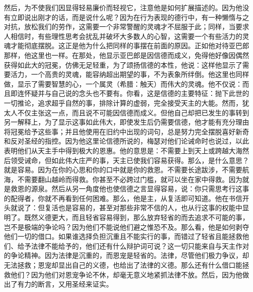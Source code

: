 然后，为不使我们因显得轻易廉价而轻视它，注意他是如何扩展描述的。因为他没有立即说出刚才的话，而是说什么呢？因为在行为表现的德行中，有一种懒惰与之对抗，放松我们的劳作，这需要一个非常警醒的灵魂才不屈服于此；同样，当要求人相信时，有些理性思考会扰乱并破坏大多数人的心智，这需要一个有些活力的灵魂才能彻底摆脱。这正是他为什么把同样的事摆在前面的原因。正如他对待亚巴郎那样，他这里也一样。在那处，他显示亚巴郎是因信德而成义，免得他好像因偶然获得如此大的冠冕，仿佛无足轻重，为了颂扬信德的本性，他说：这样他显示了需要活力，一个高贵的灵魂，能容纳超出期望的事，不为表象所绊倒。他这里也同样做，显示了需要智慧的心，一个属灵（希腊：触天）而伟大的灵魂。他不仅说：而且即连怀疑并与自己说的念头也不要有。你看，这是信德的主要特征：抛下此世的一切推论，追求超乎自然的事，排除计算的虚弱，完全接受天主的大能。然而，犹太人不仅主张这一点，而且说不可能因信德而成义。但他自己却把已发生的事转到另一解释上，为了显示这事如此伟大，即使发生后仍需要信德，他才能有充分理由将冠冕给予这些事；并且他使用在旧约中出现的词句，总是努力完全摆脱喜好新奇和反对圣经的指控。因为他这里论信德所说的，梅瑟对他们论诫命时也说过，以此表明他们从天主手中得到极大的恩惠。他的意思是：不需要上到天上或跨越大海然后领受诫命，但如此伟大庄严的事，天主已使我们容易获得。那么，是什么意思？就是容易。因为在你的心思和你的口中就是你的救恩。不需要长途跋涉，不需要航海，不需要翻山越岭而得救。你甚至不必跨过门槛，就可以坐在家中得救。因为就是救恩的源泉。然后从另一角度他也使信德之言显得容易，说：你只需思考行这事的配得者，你就不再看到任何困难。那么，他是主，从复活即可知道。他在书信开头就说了：但复活也是容易的，甚至对那些非常不信的人，也从行这事的权能中显明了。既然义德更大，而且轻省容易得到，那么放弃轻省的而去追求不可能的事，岂不是极端的争论吗？因为他们不能说他们避之惟恐不及。那么看，他是如何剥夺他们一切的借口。如果谁选择负担沉重且不能实行的事，而错过了轻省且能拯救他们、给予法律不能给予的，他们还有什么辩护词可说？这一切只能来自与天主作对的争论精神。因为法律是沉重的，而恩宠是轻省的。法律，尽管他们极力争议，却无法拯救；恩宠却显出自己的义德，也给出了法律的义德。那么还有什么借口能拯救他们？因为他们对恩宠争论不休，却毫无意义地紧抓法律不放。然后，因为他做出了有力的断言，又用圣经来证实。\par

